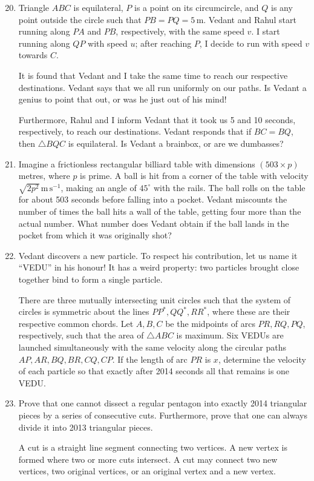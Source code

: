 \documentclass[11pt,a4paper]{article}
\begin{document}
\begin{enumerate}[label=\textbf{\arabic*.},itemsep=.75em]
\setcounter{enumi}{19}
\item Triangle $ABC$ is equilateral, $P$ is a point on its circumcircle, and $Q$ is
any point outside the circle such that $PB=PQ=5\,\mathrm m$. Vedant and Rahul start
running along $PA$ and $PB$, respectively, with the same speed $v$. I start running
along $QP$ with speed $u$; after reaching $P$, I decide to run with speed $v$ towards $C$.
\par It is found that Vedant and I take the same time to reach our respective destinations.
Vedant says that we all run uniformly on our paths. Is Vedant a genius to point that
out, or was he just out of his mind!
\par Furthermore, Rahul and I inform Vedant that it took us 5 and 10 seconds,
respectively, to reach our destinations. Vedant responds that if $BC=BQ$, then
$\triangle BQC$ is equilateral. Is Vedant a brainbox, or are we dumbasses?

\item Imagine a frictionless rectangular billiard table with dimensions
$(503\times p)$ metres, where $p$ is prime. A ball is hit from a corner of the table
with velocity $\sqrt{2p^2}\,\mathrm{m\,s^{-1}}$, making an angle of $45^\circ$ with the rails.
The ball rolls on the table for about 503 seconds before falling into a pocket.
Vedant miscounts the number of times the ball hits a wall of the table, getting four
more than the actual number. What number does Vedant obtain if the ball lands in
the pocket from which it was originally shot?

\item Vedant discovers a new particle. To respect his contribution, let us name it
``VEDU'' in his honour! It has a weird property: two particles brought close together
bind to form a single particle.
\par There are three mutually intersecting unit circles such that the system of
circles is symmetric about the lines $PP^*,QQ^*,RR^*$, where these are their respective
common chords. Let $A,B,C$ be the midpoints of arcs $PR,RQ,PQ$, respectively, such that
the area of $\triangle ABC$ is maximum. Six VEDUs are launched simultaneously with
the same velocity along the circular paths $AP,AR,BQ,BR,CQ,CP$. If the length of arc
$PR$ is $x$, determine the velocity of each particle so that exactly after 2014 seconds
all that remains is one VEDU.

\item Prove that one cannot dissect a regular pentagon into exactly 2014 triangular
pieces by a series of consecutive cuts. Furthermore, prove that one can always
divide it into 2013 triangular pieces.
\par A cut is a straight line segment connecting two vertices. A new vertex is formed
where two or more cuts intersect. A cut may connect two new vertices, two original
vertices, or an original vertex and a new vertex.


\end{enumerate}
\end{document}
